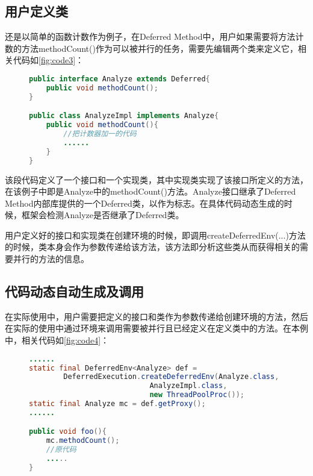 \subsection{用户定义类}

还是以简单的函数计数作为例子，在Deferred Method中，用户如果需要将方法计数的方法methodCount()作为可以被并行的任务，需要先编辑两个类来定义它，相关代码如\ref{fig:code3}：

\begin{figure}[!htp]
\begin{lstlisting}[language=Java]
public interface Analyze extends Deferred{
	public void methodCount();
}

public class AnalyzeImpl implements Analyze{
	public void methodCount(){
		//把计数器加一的代码
		......
	}
}
\end{lstlisting}
\end{figure}

该段代码定义了一个接口和一个实现类，其中实现类实现了该接口所定义的方法，在该例子中即是Analyze中的methodCount()方法。Analyze接口继承了Deferred Method内部库提供的一个Deferred类，以作为标志。在具体代码动态生成的时候，框架会检测Analyze是否继承了Deferred类。

用户定义好的接口和实现类在创建环境的时候，即调用createDeferredEnv(...)方法的时候，类本身会作为参数传递给该方法，该方法即分析这些类从而获得相关的需要并行的方法的信息。

\subsection{代码动态自动生成及调用}

在实际使用中，用户需要把定义的接口和类作为参数传递给创建环境的方法，然后在实际的使用中通过环境来调用需要被并行且已经定义在定义类中的方法。在本例中，相关代码如\ref{fig:code4}：

\begin{figure}[!htp]
\begin{lstlisting}[language=Java]
......
static final DeferredEnv<Analyze> def = 
		DeferredExecution.createDeferredEnv(Analyze.class, 
							AnalyzeImpl.class, 
							new ThreadPoolProc());
static final Analyze mc = def.getProxy();
......

public void foo(){
	mc.methodCount();
	//原代码
	.....
}
\end{lstlisting}
\end{figure}

